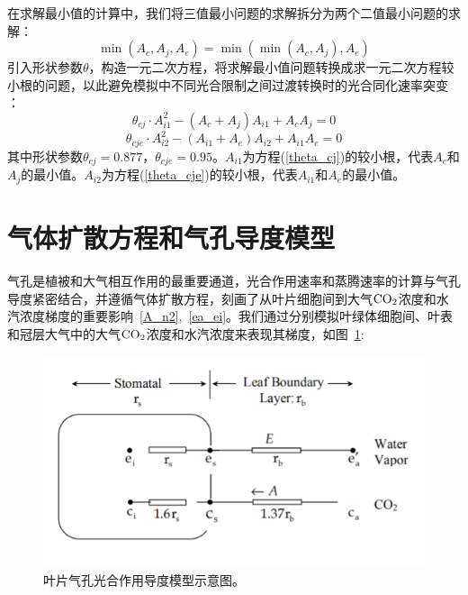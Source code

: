 在求解最小值的计算中，我们将三值最小问题的求解拆分为两个二值最小问题的求解：
\begin{equation}\label{min_Ac_Aj_Ae}
\min \left(A_{c}, A_{j}, A_{e}\right)=\min \left(\min \left(A_{c}, A_{j}\right), A_{e}\right)
\end{equation}
引入形状参数$\theta$，构造一元二次方程，将求解最小值问题转换成求一元二次方程较小根的问题，以此避免模拟中不同光合限制之间过渡转换时的光合同化速率突变 \citep{collatz1991,collatz1992}：
\begin{equation}\label{theta_cj}
\theta_{c j} \cdot A_{i1}^{2}-\left(A_{c}+A_{j}\right) A_{i1}+A_{c} A_{j}=0
\end{equation}
\begin{equation}\label{theta_cje}
\theta_{c j e} \cdot A_{i2}^{2}-\left(A_{i1}+A_{e}\right) A_{i2}+A_{i1} A_{e}=0
\end{equation}
其中形状参数$\theta_{cj}=0.877$，$\theta_{cje}=0.95$。$A_{i1}$为方程(\ref{theta_cj})的较小根，代表$A_c$和$A_j$的最小值。$A_{i2}$为方程(\ref{theta_cje})的较小根，代表$A_{i1}$和$A_e$的最小值。


\section{气体扩散方程和气孔导度模型}\label{气体扩散方程和气孔导度模型}
气孔是植被和大气相互作用的最重要通道，光合作用速率和蒸腾速率的计算与气孔导度紧密结合，并遵循气体扩散方程，刻画了从叶片细胞间到大气$\rm CO_2$浓度和水汽浓度梯度的重要影响~\eqref{A_n2},~\eqref{ea_ei}。我们通过分别模拟叶绿体细胞间、叶表和冠层大气中的大气$\rm CO_2$浓度和水汽浓度来表现其梯度，如图~\ref{fig:叶片气孔光合作用导度模型示意图}:

{
\begin{figure}[]
\centering
\includegraphics{Figures/气孔导度和光合作用/叶片气孔光合作用导度模型示意图.png}
\caption{叶片气孔光合作用导度模型示意图。}
\label{fig:叶片气孔光合作用导度模型示意图}
\end{figure}
}


